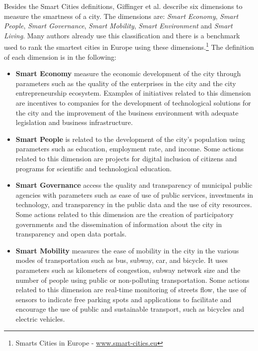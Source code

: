 Besides the Smart Cities definitions, Giffinger et al. \cite{giffinger2007smart} describe six dimensions to measure the smartness of a city. The dimensions are: \textit{Smart Economy}, \textit{Smart People}, \textit{Smart Governance}, \textit{Smart Mobility}, \textit{Smart Environment} and \textit{Smart Living}. Many authors already use this classification \cite{munoz2011forefront,papa2013towards} and there is a benchmark used to rank the smartest cities in Europe using these dimensions.\footnote{Smarts Cities in Europe - \url{www.smart-cities.eu}} The definition of each dimension is in the following:

\begin{itemize}

    \item \textbf{Smart Economy} measure the economic development of the city through parameters such as the quality of the enterprises in the city and the city entrepreneurship ecosystem. Examples of initiatives related to this dimension are incentives to companies for the development of technological solutions for the city and the improvement of the business environment with adequate legislation and business infrastructure. 
    
    \item \textbf{Smart People} is related to the development of the city's population using parameters such as education, employment rate, and income. Some actions related to this dimension are projects for digital inclusion of citizens and programs for scientific and technological education. 
     
    \item \textbf{Smart Governance} access the quality and transparency of municipal public agencies with parameters such as ease of use of public services, investments in technology, and transparency in the public data and the use of city resources. Some actions related to this dimension are the creation of participatory governments and the dissemination of information about the city in transparency and open data portals.
 
    \item \textbf{Smart Mobility} measures the ease of mobility in the city in the various modes of transportation such as bus, subway, car, and bicycle. It uses parameters such as kilometers of congestion, subway network size and the number of people using public or non-polluting transportation. Some actions related to this dimension are real-time monitoring of streets flow, the use of sensors to indicate free parking spots and applications to facilitate and encourage the use of public and sustainable transport, such as bicycles and electric vehicles.
 

\end{itemize}
